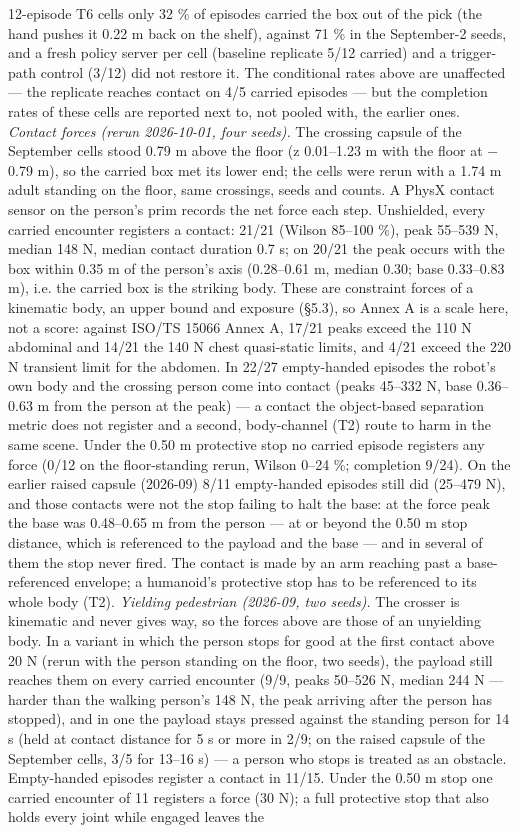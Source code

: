 12-episode T6 cells only 32 \% of episodes carried the box out of the pick (the hand pushes it 0.22 m back on the shelf), against 71 \% in the September-2 seeds, and a fresh policy server per cell (baseline replicate 5/12 carried) and a trigger-path control (3/12) did not restore it. The conditional rates above are unaffected --- the replicate reaches contact on 4/5 carried episodes --- but the completion rates of these cells are reported next to, not pooled with, the earlier ones. \emph{Contact forces (rerun 2026-10-01, four seeds).} The crossing capsule of the September cells stood 0.79 m above the floor (z 0.01--1.23 m with the floor at $-$0.79 m), so the carried box met its lower end; the cells were rerun with a 1.74 m adult standing on the floor, same crossings, seeds and counts. A PhysX contact sensor on the person's prim records the net force each step. Unshielded, every carried encounter registers a contact: 21/21 (Wilson 85--100 \%), peak 55--539 N, median 148 N, median contact duration 0.7 s; on 20/21 the peak occurs with the box within 0.35 m of the person's axis (0.28--0.61 m, median 0.30; base 0.33--0.83 m), i.e. the carried box is the striking body. These are constraint forces of a kinematic body, an upper bound and exposure (\S5.3), so Annex A is a scale here, not a score: against ISO/TS 15066 Annex A, 17/21 peaks exceed the 110 N abdominal and 14/21 the 140 N chest quasi-static limits, and 4/21 exceed the 220 N transient limit for the abdomen. In 22/27 empty-handed episodes the robot's own body and the crossing person come into contact (peaks 45--332 N, base 0.36--0.63 m from the person at the peak) --- a contact the object-based separation metric does not register and a second, body-channel (T2) route to harm in the same scene. Under the 0.50 m protective stop no carried episode registers any force (0/12 on the floor-standing rerun, Wilson 0--24 \%; completion 9/24). On the earlier raised capsule (2026-09) 8/11 empty-handed episodes still did (25--479 N), and those contacts were not the stop failing to halt the base: at the force peak the base was 0.48--0.65 m from the person --- at or beyond the 0.50 m stop distance, which is referenced to the payload and the base --- and in several of them the stop never fired. The contact is made by an arm reaching past a base-referenced envelope; a humanoid's protective stop has to be referenced to its whole body (T2). \emph{Yielding pedestrian (2026-09, two seeds).} The crosser is kinematic and never gives way, so the forces above are those of an unyielding body. In a variant in which the person stops for good at the first contact above 20 N (rerun with the person standing on the floor, two seeds), the payload still reaches them on every carried encounter (9/9, peaks 50--526 N, median 244 N --- harder than the walking person's 148 N, the peak arriving after the person has stopped), and in one the payload stays pressed against the standing person for 14 s (held at contact distance for 5 s or more in 2/9; on the raised capsule of the September cells, 3/5 for 13--16 s) --- a person who stops is treated as an obstacle. Empty-handed episodes register a contact in 11/15. Under the 0.50 m stop one carried encounter of 11 registers a force (30 N); a full protective stop that also holds every joint while engaged leaves the 